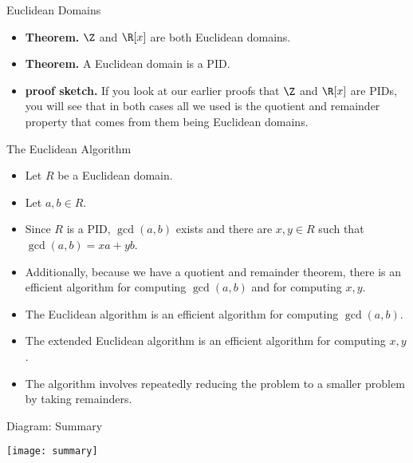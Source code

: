 \documentclass{beamer}
\begin{document}

\begin{frame}{Euclidean Domains}

\begin{itemize}
  \item \textbf{Theorem.} $\Z$ and $\R[x]$ are both Euclidean domains.
  \item \textbf{Theorem.} A Euclidean domain is a PID.
  \item \textbf{proof sketch.} If you look at our earlier proofs that $\Z$ and $\R[x]$
  are PIDs, you will see that in both cases all we used is the quotient and remainder property
  that comes from them being Euclidean domains.
\end{itemize}

\end{frame}



\begin{frame}{The Euclidean Algorithm}

\begin{itemize}
  \item Let $R$ be a Euclidean domain.
  \item Let $a,b \in R$.
  \item Since $R$ is a PID, $\gcd(a,b)$ exists and there are $x,y\in R$ such that $\gcd(a,b) = xa + yb$.
  \item Additionally, because we have a quotient and remainder theorem, there is an efficient algorithm for
  computing $\gcd(a,b)$ and for computing $x,y$.
  \item The Euclidean algorithm is an efficient algorithm for computing $\gcd(a,b)$.
  \item The extended Euclidean algorithm is an efficient algorithm for computing $x,y$.
  \item The algorithm involves repeatedly reducing the problem to a smaller problem by taking remainders.
\end{itemize}

\end{frame}



\begin{frame}{Diagram: Summary}

\begin{center}
\texttt{[image: summary]}
\end{center}

\end{frame}
\end{document}
